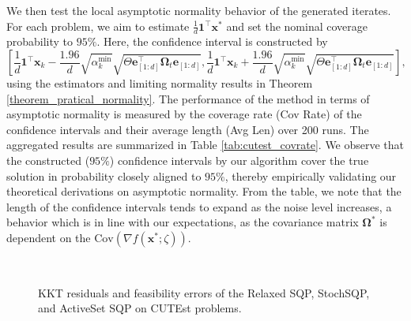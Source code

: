 \documentclass[aos]{imsart}
\numberwithin{equation}{section}
\theoremstyle{plain}
\begin{document}
We then test the local asymptotic normality behavior of the generated iterates. For each problem, we aim to estimate $\frac{1}{d}\bm{1}^{\top} \bm{x}^{*}$ and set the nominal coverage probability to $95\%$. Here, the confidence interval is constructed by $$\left[\frac{1}{d}\bm{1}^{\top} \bm{x}_{k} - \frac{1.96}{d}\sqrt{\alpha_k^{\min}}  \sqrt{\Theta \bm{e}_{[1:d]} ^{\top} \bm{\Omega}_{t} \bm{e}_{[1:d]} }, \frac{1}{d}\bm{1}^{\top} \bm{x}_{k} + \frac{1.96}{d}\sqrt{ \alpha_k^{\min}}  \sqrt{\Theta \bm{e}_{[1:d]}^{\top} \bm{\Omega}_{t} \bm{e}_{[1:d]} } \right],$$
using the estimators and limiting normality results in Theorem \ref{theorem_pratical_normality}. The performance of the method in terms of asymptotic normality is measured by the coverage rate (Cov Rate) of the confidence intervals and their average length (Avg Len) over 200 runs. The aggregated results are summarized in Table \ref{tab:cutest_covrate}. We observe that the constructed ($95\%$) confidence intervals by our algorithm cover the true solution in probability closely aligned to $95\%$, thereby empirically validating our theoretical derivations on asymptotic normality. 
From the table, we note that the length of the confidence intervals tends to expand as the noise level increases, a behavior which is in line with our expectations, as the covariance matrix $\bm{\Omega}^{*}$ is dependent on the $\text{Cov}\left( \nabla f(\bm{x}^{*};\zeta)\right)$. 


    \begin{figure}[h!]
\\
    \caption{		
	 KKT residuals and feasibility errors of the Relaxed SQP, StochSQP, and ActiveSet SQP on CUTEst problems.}	
    \label{fig:cutest_kkt}
\end{figure}  
\end{document}
